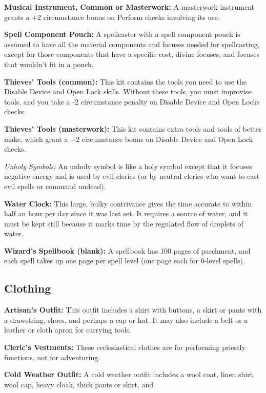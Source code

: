 \textbf{Musical Instrument, Common or Masterwork:} A masterwork instrument grants 
a +2 circumstance bonus on Perform checks involving its use.

\textbf{Spell Component Pouch:} A spellcaster with a spell component pouch is assumed 
to have all the material components and focuses needed for spellcasting, except 
for those components that have a specific cost, divine focuses, and focuses that 
wouldn't fit in a pouch.

\textbf{Thieves' Tools (common):} This kit contains the tools you need to use the Disable 
Device and Open Lock skills. Without these tools, you must improvise tools, and 
you take a -2 circumstance penalty on Disable Device and Open Locks checks.

\textbf{Thieves' Tools (masterwork):} This kit contains extra tools and tools of 
better make, which grant a +2 circumstance bonus on Disable Device and Open Lock 
checks.

\textit{Unholy Symbols:} An unholy symbol is like a holy symbol except that it 
focuses negative energy and is used by evil clerics (or by neutral clerics who 
want to cast evil spells or command undead).

\textbf{Water Clock:} This large, bulky contrivance gives the time accurate to 
within half an hour per day since it was last set. It requires a source of water, 
and it must be kept still because it marks time by the regulated flow of droplets 
of water.

\textbf{Wizard's Spellbook (blank):} A spellbook has 100 pages of parchment, and 
each spell takes up one page per spell level (one page each for 0-level spells).

\subsection{Clothing}

\textbf{Artisan's Outfit:} This outfit includes a shirt with buttons, a skirt or 
pants with a drawstring, shoes, and perhaps a cap or hat. It may also include a 
belt or a leather or cloth apron for carrying tools.

\textbf{Cleric's Vestments:} These ecclesiastical clothes are for performing priestly 
functions, not for adventuring.

\textbf{Cold Weather Outfit:} A cold weather outfit includes a wool coat, linen 
shirt, wool cap, heavy cloak, thick pants or skirt, and

